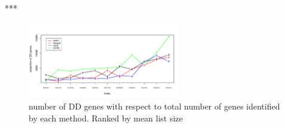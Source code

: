 \documentclass[11pt]{amsart}
\begin{document}
***

\begin{figure}[H]
\includegraphics[width = 0.6\textwidth]{Figs/DD95.pdf}
 \caption{ number of DD genes with respect to total number of genes identified by each method. Ranked by mean list size}
  \label{fig:6}
\end{figure}
\end{document}

